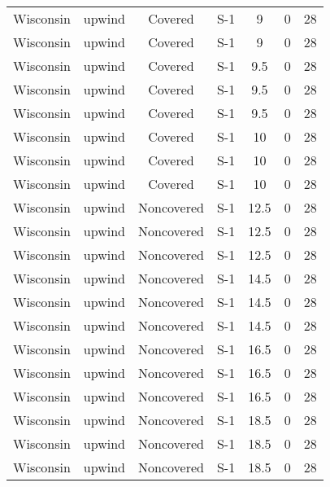 \documentclass{article}
\begin{document}
\begin{longtable}[c]{ccccccc}
Wisconsin & upwind    & Covered     & S-1             & 9            & 0           & 28  \\
Wisconsin & upwind    & Covered     & S-1             & 9            & 0           & 28  \\
Wisconsin & upwind    & Covered     & S-1             & 9.5          & 0           & 28  \\
Wisconsin & upwind    & Covered     & S-1             & 9.5          & 0           & 28  \\
Wisconsin & upwind    & Covered     & S-1             & 9.5          & 0           & 28  \\
Wisconsin & upwind    & Covered     & S-1             & 10           & 0           & 28  \\
Wisconsin & upwind    & Covered     & S-1             & 10           & 0           & 28  \\
Wisconsin & upwind    & Covered     & S-1             & 10           & 0           & 28  \\
Wisconsin & upwind    & Noncovered & S-1             & 12.5         & 0           & 28  \\
Wisconsin & upwind    & Noncovered & S-1             & 12.5         & 0           & 28  \\
Wisconsin & upwind    & Noncovered & S-1             & 12.5         & 0           & 28  \\
Wisconsin & upwind    & Noncovered & S-1             & 14.5         & 0           & 28  \\
Wisconsin & upwind    & Noncovered & S-1             & 14.5         & 0           & 28  \\
Wisconsin & upwind    & Noncovered & S-1             & 14.5         & 0           & 28  \\
Wisconsin & upwind    & Noncovered & S-1             & 16.5         & 0           & 28  \\
Wisconsin & upwind    & Noncovered & S-1             & 16.5         & 0           & 28  \\
Wisconsin & upwind    & Noncovered & S-1             & 16.5         & 0           & 28  \\
Wisconsin & upwind    & Noncovered & S-1             & 18.5         & 0           & 28  \\
Wisconsin & upwind    & Noncovered & S-1             & 18.5         & 0           & 28  \\
Wisconsin & upwind    & Noncovered & S-1             & 18.5         & 0           & 28  \\

\end{longtable}
\end{document}
